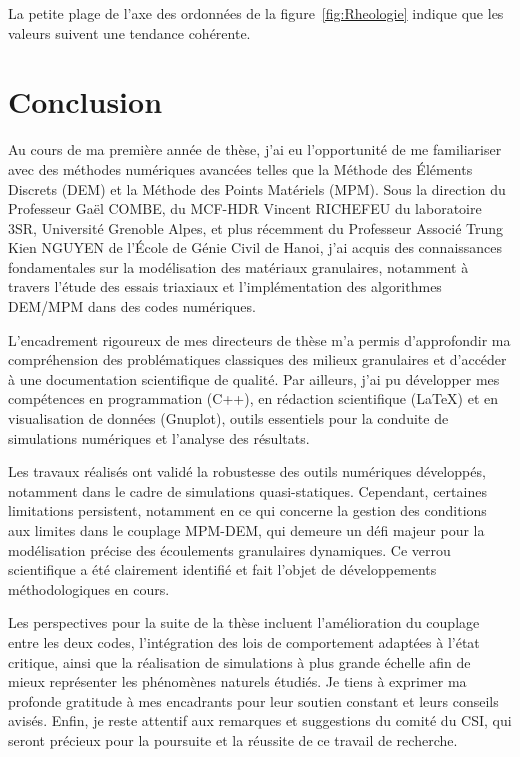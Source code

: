 \documentclass[a4paper,12pt]{report}
\begin{document}
La petite plage de l’axe des ordonnées de la figure~\ref{fig:Rheologie} indique que les valeurs suivent une tendance cohérente.

\chapter{Conclusion}

Au cours de ma première année de thèse, j’ai eu l’opportunité de me familiariser avec des méthodes numériques avancées telles que la Méthode des Éléments Discrets (DEM) et la Méthode des Points Matériels (MPM).  
Sous la direction du Professeur Gaël COMBE, du MCF-HDR Vincent RICHEFEU du laboratoire 3SR, Université Grenoble Alpes, et plus récemment du Professeur Associé Trung Kien NGUYEN de l’École de Génie Civil de Hanoi, j’ai acquis des connaissances fondamentales sur la modélisation des matériaux granulaires, notamment à travers l’étude des essais triaxiaux et l’implémentation des algorithmes DEM/MPM dans des codes numériques.

L’encadrement rigoureux de mes directeurs de thèse m’a permis d’approfondir ma compréhension des problématiques classiques des milieux granulaires et d’accéder à une documentation scientifique de qualité. Par ailleurs, j’ai pu développer mes compétences en programmation (C++), en rédaction scientifique (LaTeX) et en visualisation de données (Gnuplot), outils essentiels pour la conduite de simulations numériques et l’analyse des résultats.

Les travaux réalisés ont validé la robustesse des outils numériques développés, notamment dans le cadre de simulations quasi-statiques. Cependant, certaines limitations persistent, notamment en ce qui concerne la gestion des conditions aux limites dans le couplage MPM-DEM, qui demeure un défi majeur pour la modélisation précise des écoulements granulaires dynamiques. Ce verrou scientifique a été clairement identifié et fait l’objet de développements méthodologiques en cours.

Les perspectives pour la suite de la thèse incluent l’amélioration du couplage entre les deux codes, l’intégration des lois de comportement adaptées à l’état critique, ainsi que la réalisation de simulations à plus grande échelle afin de mieux représenter les phénomènes naturels étudiés.
Je tiens à exprimer ma profonde gratitude à mes encadrants pour leur soutien constant et leurs conseils avisés. Enfin, je reste attentif aux remarques et suggestions du comité du CSI, qui seront précieux pour la poursuite et la réussite de ce travail de recherche.



\end{document}
